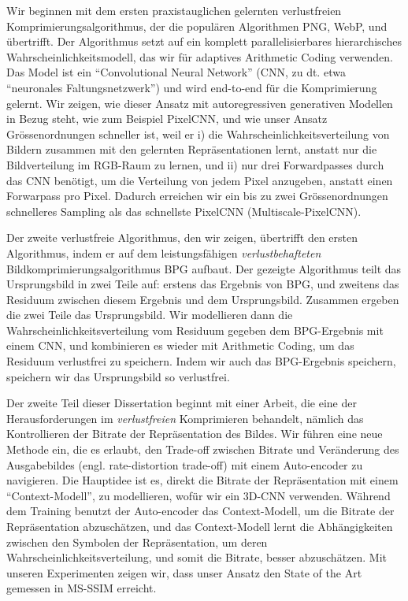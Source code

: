 Wir beginnen mit dem ersten praxistauglichen gelernten verlustfreien
Komprimierungsalgorithmus, der die populären Algorithmen PNG, WebP, und \jpegk
übertrifft. Der Algorithmus setzt auf ein komplett parallelisierbares
hierarchisches Wahrscheinlichkeitsmodell, das wir für adaptives Arithmetic
Coding verwenden. Das Model ist ein ``Convolutional Neural Network'' (CNN, zu
dt. etwa ``neuronales Faltungsnetzwerk'') und wird end-to-end für die
Komprimierung gelernt. Wir zeigen, wie dieser Ansatz mit autoregressiven
generativen Modellen in Bezug steht, wie zum Beispiel PixelCNN, und wie unser
Ansatz Grössenordnungen schneller ist, weil er i) die
Wahrscheinlichkeitsverteilung von Bildern zusammen mit den gelernten
Repräsentationen lernt, anstatt nur die Bildverteilung im RGB-Raum zu lernen,
und ii) nur drei Forwardpasses durch das CNN benötigt, um die Verteilung von
jedem Pixel anzugeben, anstatt einen Forwarpass pro Pixel. Dadurch erreichen
wir ein bis zu zwei Grössenordnungen schnelleres Sampling als das schnellste
PixelCNN (Multiscale-PixelCNN).

Der zweite verlustfreie Algorithmus, den wir zeigen, übertrifft den ersten
Algorithmus, indem er auf dem leistungsfähigen \emph{verlustbehafteten}
Bildkomprimierungsalgorithmus BPG aufbaut. Der gezeigte Algorithmus teilt das
Ursprungsbild in zwei Teile auf: erstens das Ergebnis von BPG, und zweitens das
Residuum zwischen diesem Ergebnis und dem Ursprungsbild. Zusammen ergeben die
zwei Teile das Ursprungsbild. Wir modellieren dann die
Wahrscheinlichkeitsverteilung vom Residuum gegeben dem BPG-Ergebnis mit einem
CNN, und kombinieren es wieder mit Arithmetic Coding, um das Residuum
verlustfrei zu speichern. Indem wir auch das BPG-Ergebnis speichern, speichern
wir das Ursprungsbild so verlustfrei.

Der zweite Teil dieser Dissertation beginnt mit einer Arbeit, die eine der
Herausforderungen im \emph{verlustfreien} Komprimieren behandelt, nämlich das
Kontrollieren der Bitrate der Repräsentation des Bildes. Wir führen eine neue
Methode ein, die es erlaubt, den Trade-off zwischen Bitrate und Veränderung
des Ausgabebildes (engl. rate-distortion trade-off) mit einem Auto-encoder zu
navigieren. Die Hauptidee ist es, direkt die Bitrate der Repräsentation mit
einem ``Context-Modell'', zu modellieren, wofür wir ein 3D-CNN verwenden.
Während dem Training benutzt der Auto-encoder das Context-Modell, um die
Bitrate der Repräsentation abzuschätzen, und das Context-Modell lernt die
Abhängigkeiten zwischen den Symbolen der Repräsentation, um deren
Wahrscheinlichkeitsverteilung, und somit die Bitrate, besser abzuschätzen. Mit
unseren Experimenten zeigen wir, dass unser Ansatz den State of the Art
gemessen in MS-SSIM erreicht.

